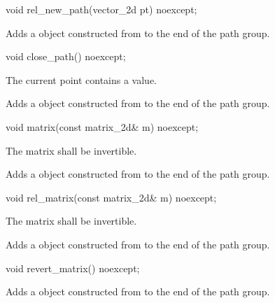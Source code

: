 %
\begin{itemdecl}
void rel_new_path(vector_2d pt) noexcept;
\end{itemdecl}
\begin{itemdescr}
\pnum
\effects
Adds a  object constructed from  to the end of the path group.
\end{itemdescr}

%
\begin{itemdecl}
void close_path() noexcept;
\end{itemdecl}
\begin{itemdescr}
\pnum
\requires
The current point contains a value.

\pnum
\effects
Adds a  object constructed from  to the end of the path group.
\end{itemdescr}

%
\begin{itemdecl}
void matrix(const matrix_2d& m) noexcept;
\end{itemdecl}
\begin{itemdescr}
\pnum
\requires
The matrix  shall be invertible.

\pnum
\effects
Adds a  object constructed from  to the end of the path group.
\end{itemdescr}

%
\begin{itemdecl}
void rel_matrix(const matrix_2d& m) noexcept;
\end{itemdecl}
\begin{itemdescr}
\pnum
\requires
The matrix  shall be invertible.

\pnum
\effects
Adds a  object constructed from  to the end of the path group.
\end{itemdescr}

%
\begin{itemdecl}
void revert_matrix() noexcept;
\end{itemdecl}
\begin{itemdescr}
\pnum
\effects
Adds a  object constructed from  to the end of the path group.
\end{itemdescr}

